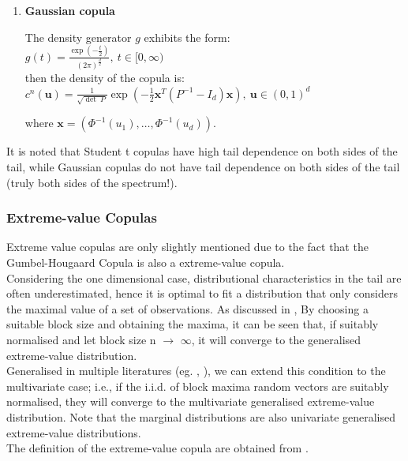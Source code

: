 \documentclass[12pt]{report}
\newcommand{\1}{\mathbf{1}}
\begin{document}
\begin{flushleft}
\begin{enumerate}
\item \textbf{Gaussian copula} \parencite{HofertBook} \\ 
\vspace{0.5cm}

The density generator $g$ exhibits the form:\\
\vspace{0.5cm}
$g(t) = \frac{\exp(-\frac{t}{2})}{(2\pi)^{\frac{d}{2}}}, \: t \in [0,\infty)$ \\
\vspace{0.5cm}
then the density of the copula is:\\
\vspace{0.5cm}
$ c^{n}(\textbf{u}) = \frac{1}{\sqrt{\det \: P}} \exp \left(-\frac{1}{2}\textbf{x}^{T}(P^{-1}-I_{d})\textbf{x} \right), \: \textbf{u} \in (0,1)^{d}$ \\
\vspace{0.5cm}

where $\textbf{x} = (\Phi^{-1}(u_{1}), \dots, \Phi^{-1}(u_{d}))$.\\

\end{enumerate}

It is noted that Student t copulas have high tail dependence on both sides of the tail, while Gaussian copulas do not have tail dependence on both sides of the tail (truly both sides of the spectrum!).\\

\subsubsection{Extreme-value Copulas}
\vspace{0.5cm}

Extreme value copulas are only slightly mentioned due to the fact that the Gumbel-Hougaard Copula is also a extreme-value copula.\\
\vspace{0.5cm}
Considering the one dimensional case, distributional characteristics in the tail are often underestimated, hence it is optimal to fit a distribution that only considers the maximal value of a set of observations. As discussed in \cite{ModellingExtremalEventsForInsuranceandFinance}, By choosing a suitable block size and obtaining the maxima, it can be seen that, if suitably normalised and let block size n $\rightarrow$ $\infty$, it will converge to the generalised extreme-value distribution.\\
\vspace{0.5cm}
Generalised in multiple literatures (eg. \cite{EVTAnIntro}, \cite{HofertBook}), we can extend this condition to the multivariate case; i.e., if the i.i.d. of block maxima random vectors are suitably normalised, they will converge to the multivariate generalised extreme-value distribution. Note that the marginal distributions are also univariate generalised extreme-value distributions.  \\
\vspace{0.5cm}
The definition of the extreme-value copula are obtained from \cite{HofertBook}.


\end{flushleft}
\end{document}
